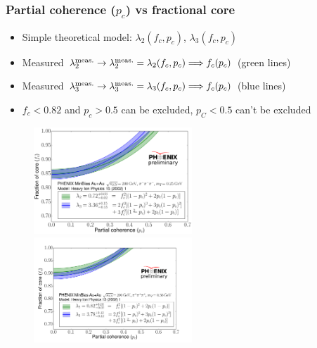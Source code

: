 \documentclass{beamer}
\begin{document}
\begin{frame}
\frametitle{Partial coherence ($p_c$) vs fractional core}
\begin{itemize}
\vspace{-0.004\textheight}
\item Simple theoretical model: $\lambda_2(f_c, p_c)$, $\lambda_3(f_c, p_c)$ 
\item Measured $\lambda_2^{\rm meas.} \rightarrow \lambda_2^{\rm meas.}=\lambda_2(f_c,p_c) \Longrightarrow f_c(p_c)$ (green lines)
\item Measured $\lambda_3^{\rm meas.} \rightarrow \lambda_3^{\rm meas.}=\lambda_3(f_c,p_c) \Longrightarrow f_c(p_c)$ (blue lines)
\item $f_c<0.82$ and $p_c>0.5$ can be excluded, $p_C<0.5$ can't be excluded
\end{itemize}

\begin{figure}
\hspace*{-0.29cm}\includegraphics[width=0.53\textwidth]{pic/cropped_fcpc1}
\hspace*{-0.05cm}\includegraphics[width=0.53\textwidth]{pic/cropped_fcpc2}
\end{figure}
\end{frame}
\end{document}

